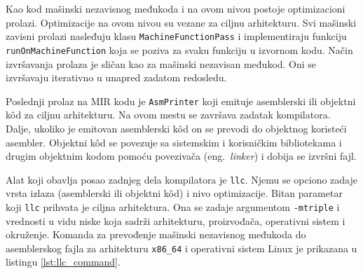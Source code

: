 \documentclass[12pt,oneside]{memoir}
\begin{document}

Kao kod mašinski nezavisnog međukoda i na ovom nivou postoje optimizacioni prolazi.
Optimizacije na ovom nivou su vezane za ciljnu arhitekturu.
Svi mašinski zavisni prolazi nasleđuju klasu \verb|MachineFunctionPass| i implementiraju funkciju \verb|runOnMachineFunction| koja se poziva za svaku funkciju u izvornom kodu.
Način izvršavanja prolaza je sličan kao za mašinski nezavisan međukod.
Oni se izvršavaju iterativno u unapred zadatom redosledu.

Poslednji prolaz na MIR kodu je \verb|AsmPrinter| koji emituje asemblerski ili objektni k\^od za ciljnu arhitekturu.
Na ovom mestu se završava zadatak kompilatora.
Dalje, ukoliko je emitovan asemblerski k\^od on se prevodi do objektnog koristeći asembler.
Objektni k\^od se povezuje sa sistemskim i korisničkim bibliotekama i drugim objektnim kodom pomoću povezivača (eng.~{\em linker}) i dobija se izvršni fajl.

Alat koji obavlja posao zadnjeg dela kompilatora je \verb|llc|.
Njemu se opciono zadaje vrsta izlaza (asemblerski ili objektni k\^od) i nivo optimizacije.
Bitan parametar koji \verb|llc| prihvata je ciljna arhitektura.
Ona se zadaje argumentom \verb|-mtriple| i vrednosti u vidu niske koja sadrži arhitekturu, proizvođača, operativni sistem i okruženje.
Komanda za prevođenje mašinski nezavisnog međukoda do asemblerskog fajla za arhitekturu \verb|x86_64| i operativni sistem Linux je prikazana u listingu \ref{lst:llc_command}.
\end{document}
